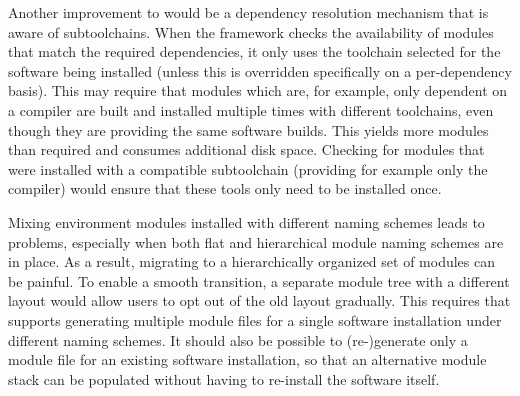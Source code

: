Another improvement to \easybuild{} would be a dependency resolution
mechanism that is aware of subtoolchains. When the \easybuild{} framework checks the
availability of modules that match the required dependencies, it only uses the toolchain
selected for the software being installed (unless this is overridden specifically on a
per-dependency basis). This may require that modules which are, for example, only
dependent on a compiler are built and installed multiple times with different
toolchains, even though they are providing the same software builds. This yields
more modules than required and consumes additional disk space. Checking for
modules that were installed with a compatible subtoolchain (providing for example
only the compiler) would ensure that these tools only need to be installed once.

Mixing environment modules installed with different naming schemes leads to problems,
especially when both flat and hierarchical module naming schemes are in place.
As a result, migrating to a hierarchically organized set of modules can be painful.
To enable a smooth transition, a separate module tree with a different layout
would allow users to opt out of the old layout gradually.
This requires that \easybuild{} supports generating multiple module files for a
single software installation under different naming schemes. It should also be
possible to (re-)generate only a module file for an existing software installation,
so that an alternative module stack can be populated without having to re-install the
software itself.


